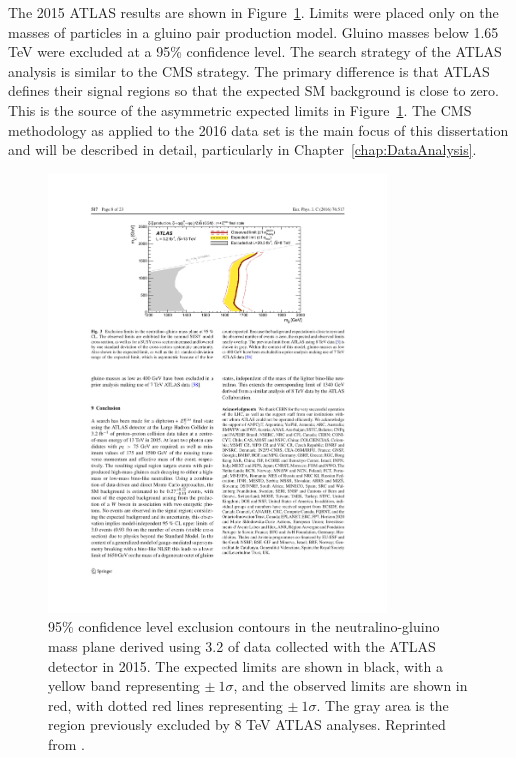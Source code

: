 The 2015 ATLAS results are shown in Figure~\ref{fig:Limits2015ATLAS}. 
Limits were placed only on the masses of particles in a gluino pair production model. 
Gluino masses below 1.65 TeV were excluded at a 95\% confidence level.
The search strategy of the ATLAS analysis is similar to the CMS strategy. 
The primary difference is that ATLAS defines their signal regions so that the expected SM background is close to zero. 
This is the source of the asymmetric expected limits in Figure~\ref{fig:Limits2015ATLAS}.
The CMS methodology as applied to the 2016 data set is the main focus of this dissertation and 
will be described in detail, particularly in Chapter~\ref{chap:DataAnalysis}. 


\begin{figure}[h]
\begin{center}
\includegraphics[width=0.8\textwidth]{Figures/Theory/2015ATLAS.pdf}
\end{center}
    \caption{95\% confidence level exclusion contours in the neutralino-gluino mass plane derived using 3.2 \fbinv of data collected with the ATLAS detector in 2015. The expected limits are shown in black, with a yellow band representing $\pm~1\sigma$, and the observed limits are shown in red, with dotted red lines representing $\pm~1\sigma$. The gray area is the region previously excluded by 8 TeV ATLAS analyses. Reprinted from \cite{ATLAS:2016aa}.}
    \label{fig:Limits2015ATLAS}
\end{figure}


